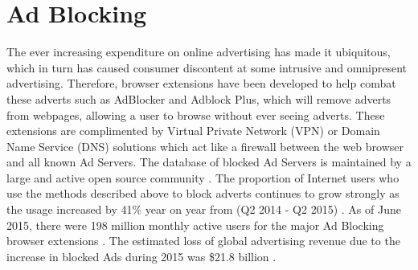 \documentclass[12pt]{article}
\begin{document}
\pagebreak

\section{Ad Blocking} \label{adBlock}
The ever increasing expenditure on online advertising has made it ubiquitous, which in turn has caused consumer discontent at some intrusive and omnipresent advertising. Therefore, browser extensions have been developed to help combat these adverts such as AdBlocker and Adblock Plus, which will remove adverts from webpages, allowing a user to browse without ever seeing adverts. These extensions are complimented by Virtual Private Network (VPN) or Domain Name Service (DNS) solutions which act like a firewall between the web browser and all known Ad Servers. The database of blocked Ad Servers is maintained by a large and active open source community \parencite{adobeAdBlock}. The proportion of Internet users who use the methods described above to block adverts continues to grow strongly as the usage increased by 41\% year on year from (Q2 2014 - Q2 2015) \parencite{adobeAdBlock}. As of June 2015, there were 198 million monthly active users for the major Ad Blocking browser extensions \parencite{adobeAdBlock}. The estimated loss of global advertising revenue due to the increase in blocked Ads during 2015 was \$21.8 billion \parencite{adobeAdBlock}. \\
\end{document}
